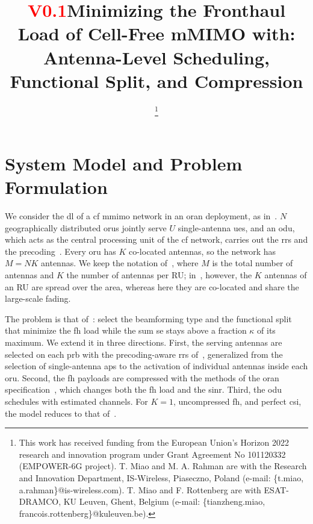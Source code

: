 \documentclass[10pt, final, journal, letterpaper, twocolumn]{IEEEtran}
\newcommand{\draftversion}{\textcolor{red}{V0.1}}
\begin{document}
\title{\draftversion \quad Minimizing the Fronthaul Load of Cell-Free mMIMO with: Antenna-Level Scheduling, Functional Split, and Compression}

\author{

     \thanks{
      This work has received funding from the European Union's Horizon 2022 research and innovation program under Grant Agreement No 101120332 (EMPOWER-6G project).
      T. Miao and M. A. Rahman are with the Research and Innovation Department, IS-Wireless, Piaseczno, Poland (e-mail: \{t.miao, a.rahman\}@is-wireless.com). T. Miao and F. Rottenberg are with ESAT-DRAMCO, KU Leuven, Ghent, Belgium (e-mail: \{tianzheng.miao, francois.rottenberg\}@kuleuven.be). 
    }
}

\maketitle

\section{System Model and Problem Formulation}\label{sec:system}

We consider the \gls{dl} of a \gls{cf} \gls{mmimo} network in an \gls{oran} deployment, as in~\cite{girycki2024eucnc}. $N$ geographically distributed \glspl{oru} jointly serve $U$ single-antenna \glspl{ue}, and an \gls{odu}, which acts as the central processing unit of the \gls{cf} network, carries out the \gls{rrs} and the precoding~\cite{ngo2017cellfree,interdonato2019ubiquitous,polese2023oran}. Every \gls{oru} has $K$ co-located antennas, so the network has $M = NK$ antennas. We keep the notation of~\cite{girycki2024eucnc}, where $M$ is the total number of antennas and $K$ the number of antennas per RU; in~\cite{girycki2024eucnc}, however, the $K$ antennas of an RU are spread over the area, whereas here they are co-located and share the large-scale fading.

The problem is that of~\cite{girycki2024eucnc}: select the beamforming type and the functional split that minimize the \gls{fh} load while the sum \gls{se} stays above a fraction $\kappa$ of its maximum. We extend it in three directions. First, the serving antennas are selected on each \gls{prb} with the precoding-aware \gls{rrs} of~\cite{girycki2024twc}, generalized from the selection of single-antenna \glspl{ap} to the activation of individual antennas inside each \gls{oru}. Second, the \gls{fh} payloads are compressed with the methods of the \gls{oran} specification~\cite{oran_cus_v22}, which changes both the \gls{fh} load and the \gls{sinr}. Third, the \gls{odu} schedules with estimated channels. For $K = 1$, uncompressed \gls{fh}, and perfect \gls{csi}, the model reduces to that of~\cite{girycki2024eucnc}.
\end{document}
